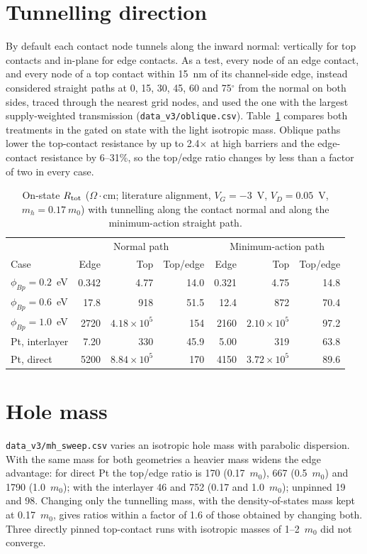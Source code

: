 \documentclass[11pt]{article}
\providecommand{\ohmcm}{\ensuremath{\Omega\cdot\mathrm{cm}}}
\providecommand{\ohmcm}{\ensuremath{\Omega\cdot\mathrm{cm}}}
\begin{document}
\section{Tunnelling direction}
\label{sec:oblique}
By default each contact node tunnels along the inward normal: vertically for top contacts and in-plane for edge contacts. As a test, every node of an edge contact, and every node of a top contact within 15~nm of its channel-side edge, instead considered straight paths at 0, 15, 30, 45, 60 and 75$^\circ$ from the normal on both sides, traced through the nearest grid nodes, and used the one with the largest supply-weighted transmission (\texttt{data\_v3/oblique.csv}). Table~\ref{tab:oblique} compares both treatments in the gated on state with the light isotropic mass. Oblique paths lower the top-contact resistance by up to 2.4$\times$ at high barriers and the edge-contact resistance by 6--31\%, so the top/edge ratio changes by less than a factor of two in every case.

\begin{table}[!htbp]
\centering
\caption{On-state $R_{\rm tot}$ (\ohmcm; literature alignment, $V_G=-3$~V, $V_D=0.05$~V, $m_h=0.17~m_0$) with tunnelling along the contact normal and along the minimum-action straight path.}
\label{tab:oblique}\small
\begin{tabular}{lrrrrrr}
\toprule
 & \multicolumn{3}{c}{Normal path} & \multicolumn{3}{c}{Minimum-action path} \\
Case & Edge & Top & Top/edge & Edge & Top & Top/edge \\
\midrule
$\phi_{Bp}=0.2$~eV & 0.342 & 4.77 & 14.0 & 0.321 & 4.75 & 14.8 \\
$\phi_{Bp}=0.6$~eV & 17.8 & 918 & 51.5 & 12.4 & 872 & 70.4 \\
$\phi_{Bp}=1.0$~eV & 2720 & $4.18\times10^5$ & 154 & 2160 & $2.10\times10^5$ & 97.2 \\
Pt, interlayer & 7.20 & 330 & 45.9 & 5.00 & 319 & 63.8 \\
Pt, direct & 5200 & $8.84\times10^5$ & 170 & 4150 & $3.72\times10^5$ & 89.6 \\
\bottomrule
\end{tabular}
\end{table}

\section{Hole mass}
\label{sec:mass}
\texttt{data\_v3/mh\_sweep.csv} varies an isotropic hole mass with parabolic dispersion. With the same mass for both geometries a heavier mass widens the edge advantage: for direct Pt the top/edge ratio is 170 (0.17~$m_0$), 667 (0.5~$m_0$) and 1790 (1.0~$m_0$); with the interlayer 46 and 752 (0.17 and 1.0~$m_0$); unpinned 19 and 98. Changing only the tunnelling mass, with the density-of-states mass kept at 0.17~$m_0$, gives ratios within a factor of 1.6 of those obtained by changing both. Three directly pinned top-contact runs with isotropic masses of 1--2~$m_0$ did not converge.
\end{document}
